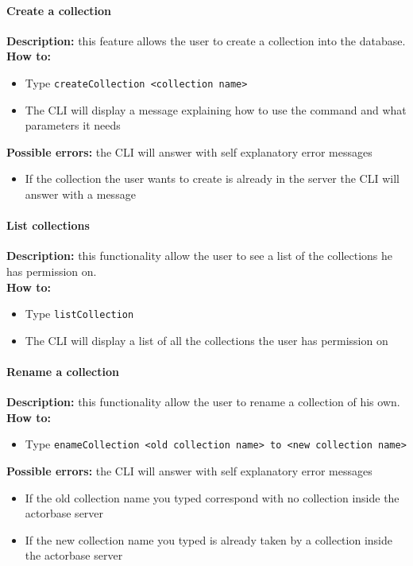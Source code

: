 \documentclass{scalatekids-article}
\begin{document}
\paragraph{Create a collection}
\label{sec:createcollection}
\textbf{Description:} this feature allows the user to create a 
collection into the database.\\
\textbf{How to:} 
\begin{itemize}
	\item Type \texttt{createCollection <collection name>}
	\item The CLI will display a message explaining how to use the command and what parameters it needs
\end{itemize}
\textbf{Possible errors:} the CLI will answer with self explanatory error messages 
\begin{itemize}
	\item If the collection the user wants to create is already in the server the CLI will answer with a message
\end{itemize}

\paragraph{List collections}
\label{sec:listcollection}
\textbf{Description:} this functionality allow the user to see a list of 
the collections he has permission on.\\
\textbf{How to:} 
\begin{itemize}
	\item Type \texttt{listCollection}
	\item The CLI will display a list of all the collections the user has 
	permission on
\end{itemize}

\paragraph{Rename a collection}
\label{sec:renamecollection}
\textbf{Description:} this functionality allow the user to rename a 
collection of his own.\\
\textbf{How to:} 
\begin{itemize}
	\item Type \texttt{enameCollection <old collection name> to <new collection name>}
\end{itemize}
\textbf{Possible errors:} the CLI will answer with self explanatory error messages 
\begin{itemize}
	\item If the old collection name you typed correspond with no collection inside the actorbase server
	\item If the new collection name you typed is already taken by a collection inside the actorbase server 
\end{itemize}
\end{document}
